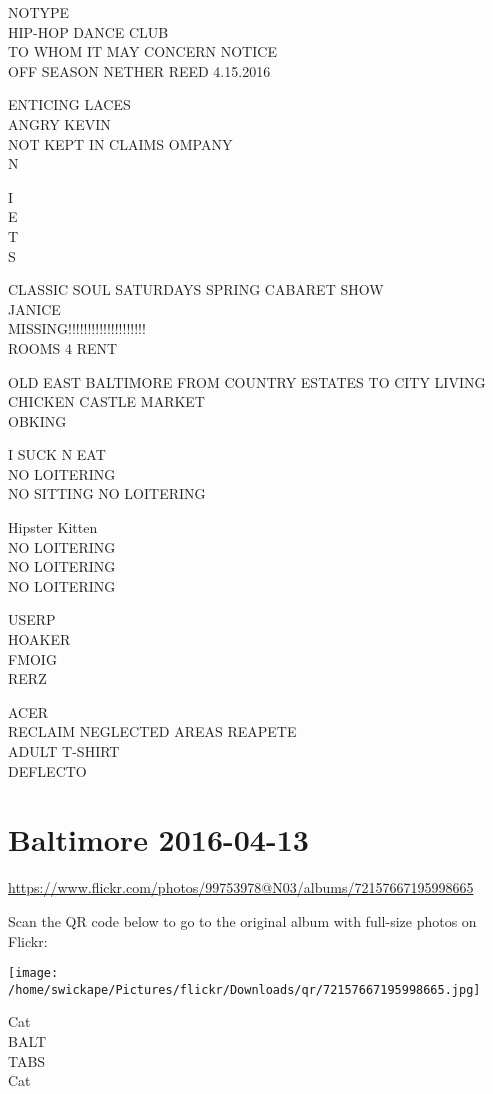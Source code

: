 \documentclass[10pt,letterpaper]{article}
\begin{document}
NOTYPE\\
HIP{-}HOP DANCE CLUB\\
TO WHOM IT MAY CONCERN NOTICE\\
OFF SEASON NETHER REED 4.15.2016

ENTICING LACES\\
ANGRY KEVIN\\
NOT KEPT IN CLAIMS OMPANY\\
N

I\\
E\\
T\\
S

CLASSIC SOUL SATURDAYS SPRING CABARET SHOW\\
JANICE\\
MISSING!!!!!!!!!!!!!!!!!!!!\\
ROOMS 4 RENT

OLD EAST BALTIMORE FROM COUNTRY ESTATES TO CITY LIVING\\
CHICKEN CASTLE MARKET\\
OBKING

I SUCK N EAT\\
NO LOITERING\\
NO SITTING NO LOITERING

Hipster Kitten\\
NO LOITERING\\
NO LOITERING\\
NO LOITERING

USERP\\
HOAKER\\
FMOIG\\
RERZ

ACER\\
RECLAIM NEGLECTED AREAS REAPETE\\
ADULT T{-}SHIRT\\
DEFLECTO


\section*{Baltimore 2016-04-13}

\url{https://www.flickr.com/photos/99753978@N03/albums/72157667195998665}

Scan the QR code below to go to the original album with full-size photos on Flickr:

\texttt{[image: /home/swickape/Pictures/flickr/Downloads/qr/72157667195998665.jpg]}


Cat\\
BALT\\
TABS\\
Cat
\end{document}
